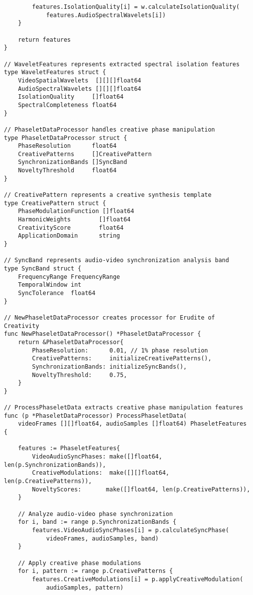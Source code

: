 \begin{tcolorbox}[colback=CodeBackground, colframe=DarkGray, title=Video-Audio Dataset Processing, fonttitle=\bfseries]
\begin{verbatim}
        features.IsolationQuality[i] = w.calculateIsolationQuality(
            features.AudioSpectralWavelets[i])
    }
    
    return features
}

// WaveletFeatures represents extracted spectral isolation features
type WaveletFeatures struct {
    VideoSpatialWavelets  [][][]float64
    AudioSpectralWavelets [][][]float64
    IsolationQuality     []float64
    SpectralCompleteness float64
}

// PhaseletDataProcessor handles creative phase manipulation
type PhaseletDataProcessor struct {
    PhaseResolution      float64
    CreativePatterns     []CreativePattern
    SynchronizationBands []SyncBand
    NoveltyThreshold     float64
}

// CreativePattern represents a creative synthesis template
type CreativePattern struct {
    PhaseModulationFunction []float64
    HarmonicWeights        []float64
    CreativityScore        float64
    ApplicationDomain      string
}

// SyncBand represents audio-video synchronization analysis band
type SyncBand struct {
    FrequencyRange FrequencyRange
    TemporalWindow int
    SyncTolerance  float64
}

// NewPhaseletDataProcessor creates processor for Erudite of Creativity
func NewPhaseletDataProcessor() *PhaseletDataProcessor {
    return &PhaseletDataProcessor{
        PhaseResolution:      0.01, // 1% phase resolution
        CreativePatterns:     initializeCreativePatterns(),
        SynchronizationBands: initializeSyncBands(),
        NoveltyThreshold:     0.75,
    }
}

// ProcessPhaseletData extracts creative phase manipulation features
func (p *PhaseletDataProcessor) ProcessPhaseletData(
    videoFrames [][]float64, audioSamples []float64) PhaseletFeatures {
    
    features := PhaseletFeatures{
        VideoAudioSyncPhases: make([]float64, len(p.SynchronizationBands)),
        CreativeModulations:  make([][]float64, len(p.CreativePatterns)),
        NoveltyScores:       make([]float64, len(p.CreativePatterns)),
    }
    
    // Analyze audio-video phase synchronization
    for i, band := range p.SynchronizationBands {
        features.VideoAudioSyncPhases[i] = p.calculateSyncPhase(
            videoFrames, audioSamples, band)
    }
    
    // Apply creative phase modulations
    for i, pattern := range p.CreativePatterns {
        features.CreativeModulations[i] = p.applyCreativeModulation(
            audioSamples, pattern)
        

\end{verbatim}
\end{tcolorbox}
